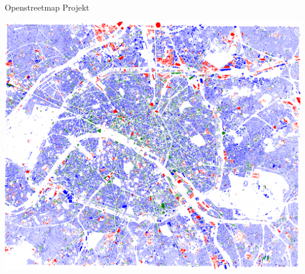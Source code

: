 \documentclass[ignorenonframetext,]{beamer}
\begin{document}
\begin{frame}{Openstreetmap Projekt}

\includegraphics{figure/Buldings_Paris.PNG}

\end{frame}
\end{document}
